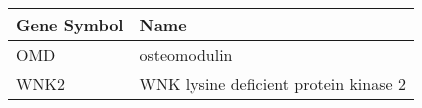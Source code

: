 \begin{tabular}{ll}
\toprule
Gene Symbol &                                  Name \\
\midrule
        OMD &                          osteomodulin \\
       WNK2 & WNK lysine deficient protein kinase 2 \\
\bottomrule
\end{tabular}
